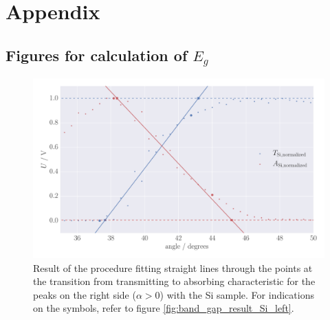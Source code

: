 \section{Appendix}

\subsection{Figures for calculation of $E_g$}
\label{sec:appendix_band_gap_plots}
\begin{figure}[htpb]
    \centering
    \includegraphics[width=1.0\linewidth]{figures/band_gap_result_Si_right}
    \caption{
        Result of the procedure fitting straight lines through the points 
        at the transition from transmitting to absorbing characteristic
        for the peaks on the right side ($\alpha > 0$) with the Si sample.
        For indications on the symbols, refer to figure 
        \ref{fig:band_gap_result_Si_left}. 
        }
    \label{fig:band_gap_result_Si_right}
\end{figure}

